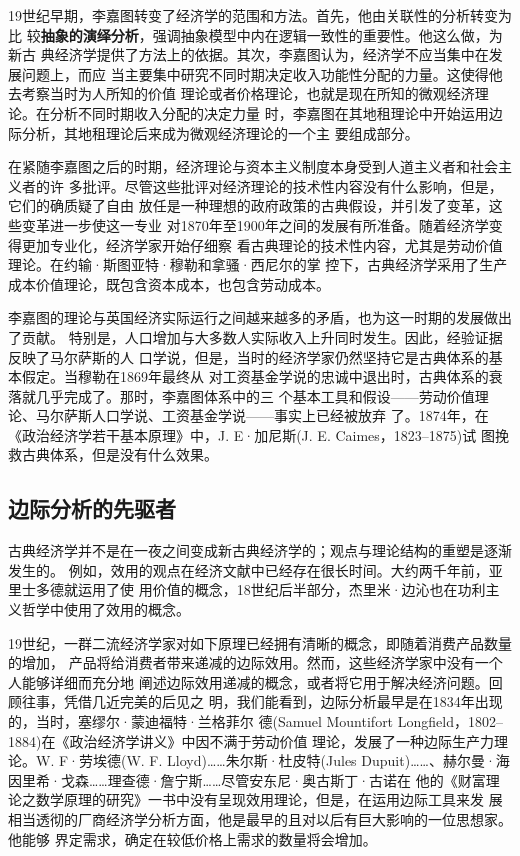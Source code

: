 19世纪早期，李嘉图转变了经济学的范围和方法。首先，他由关联性的分析转变为比
较\textbf{抽象的演绎分析}，强调抽象模型中内在逻辑一致性的重要性。他这么做，为新古
典经济学提供了方法上的依据。其次，李嘉图认为，经济学不应当集中在发展问题上，而应
当主要集中研究不同时期决定收入功能性分配的力量。这使得他去考察当时为人所知的价值
理论或者价格理论，也就是现在所知的微观经济理论。在分析不同时期收入分配的决定力量
时，李嘉图在其地租理论中开始运用边际分析，其地租理论后来成为微观经济理论的一个主
要组成部分。

在紧随李嘉图之后的时期，经济理论与资本主义制度本身受到人道主义者和社会主义者的许
多批评。尽管这些批评对经济理论的技术性内容没有什么影响，但是，它们的确质疑了自由
放任是一种理想的政府政策的古典假设，并引发了变革，这些变革进一步使这一专业
对1870年至1900年之间的发展有所准备。随着经济学变得更加专业化，经济学家开始仔细察
看古典理论的技术性内容，尤其是劳动价值理论。在约输·斯图亚特·穆勒和拿骚·西尼尔的掌
控下，古典经济学采用了生产成本价值理论，既包含资本成本，也包含劳动成本。

李嘉图的理论与英国经济实际运行之间越来越多的矛盾，也为这一时期的发展做出了贡献。
特别是，人口增加与大多数人实际收入上升同时发生。因此，经验证据反映了马尔萨斯的人
口学说，但是，当时的经济学家仍然坚持它是古典体系的基本假定。当穆勒在1869年最终从
对工资基金学说的忠诚中退出时，古典体系的衰落就几乎完成了。那时，李嘉图体系中的三
个基本工具和假设——劳动价值理论、马尔萨斯人口学说、工资基金学说——事实上已经被放弃
了。1874年，在《政治经济学若干基本原理》中，J. E·加尼斯(J. E. Caimes，1823--1875)试
图挽救古典体系，但是没有什么效果。

\subsection{边际分析的先驱者}

古典经济学并不是在一夜之间变成新古典经济学的；观点与理论结构的重塑是逐渐发生的。
例如，效用的观点在经济文献中已经存在很长时间。大约两千年前，亚里士多德就运用了使
用价值的概念，18世纪后半部分，杰里米·边沁也在功利主义哲学中使用了效用的概念。

19世纪，一群二流经济学家对如下原理已经拥有清晰的概念，即随着消费产品数量的增加，
产品将给消费者带来递减的边际效用。然而，这些经济学家中没有一个人能够详细而充分地
阐述边际效用递减的概念，或者将它用于解决经济问题。回顾往事，凭借几近完美的后见之
明，我们能看到，边际分析最早是在1834年出现的，当时，塞缪尔·蒙迪福特·兰格菲尔
德(Samuel Mountifort Longfield，1802--1884)在《政治经济学讲义》中因不满于劳动价值
理论，发展了一种边际生产力理论。W. F·劳埃德(W. F. Lloyd)……朱尔斯·杜皮特(Jules
Dupuit)……、赫尔曼·海因里希·戈森……理查德·詹宁斯……尽管安东尼·奥古斯丁·古诺在
他的《财富理论之数学原理的研究》一书中没有呈现效用理论，但是，在运用边际工具来发
展相当透彻的厂商经济学分析方面，他是最早的且对以后有巨大影响的一位思想家。他能够
界定需求，确定在较低价格上需求的数量将会增加。

